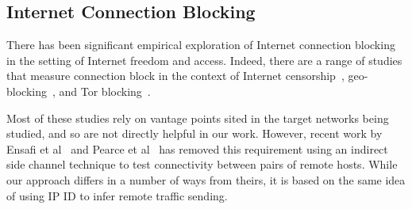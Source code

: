 \subsection{Internet Connection Blocking}
There has been significant empirical exploration of
Internet connection blocking in the setting of Internet freedom and access.
Indeed, there are a range of studies that measure connection block in the
context of Internet censorship~\cite{aryan2013internet,
park2010empirical,anderson2012splinternet,zittrain2003internet,clayton2006ignoring},
geo-blocking~\cite{opennetsurvey, mcdonald2018403,afroz2018exploring}, and
Tor blocking~\cite{singh2017characterizing, khattak2016you}.

Most of these studies rely on vantage points sited in the target
networks being studied, and so are not directly helpful in our work.
However, recent work by Ensafi et al~\cite{ensafi2014detecting} and
Pearce et al~\cite{pearce2017augur} has removed this requirement using
an indirect side channel technique to test connectivity between pairs
of remote hosts.  While our approach differs in a number of ways from
theirs, it is based on the same idea of using IP ID to infer remote
traffic sending.


